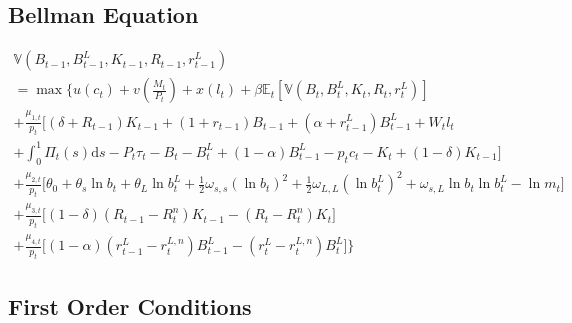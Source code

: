 \documentclass[11pt,a4paper,margin=1.5in]{article}
\begin{document}
\subsection{Bellman Equation}

\begin{multline}
	\mathbb{V}\!\left(B_{t-1}, B^L_{t-1}, K_{t-1}, R_{t-1}, r^L_{t-1}\right) \\= \max \Bigg\{u(c_t) + v\left(\frac{M_t}{P_t}\right) + x(l_t)  + \beta\mathbb{E}_t\!\left[\mathbb{V}\!\left(B_{t}, B^L_{t}, K_{t}, R_{t}, r^L_{t}\right)\right] \\
	+ \frac{\mu_{1,t}}{p_t} \Big[(\delta + R_{t-1})K_{t-1} + (1+r_{t-1})B_{t-1} + (\alpha + r^L_{t-1})B^L_{t-1} + W_tl_t \\+ \int^1_0\Pi_t(s)\text{d}s -P_t\tau_t -B_t - B^{L}_t + (1-\alpha)B^L_{t-1} - p_tc_t - K_t + (1-\delta)K_{t-1}\Big] \\
	+ \frac{\mu_{2,t}}{p_t}\Bigg[\theta_0 + \theta_s \ln b_t + \theta_L \ln b^L_t + \frac{1}{2}\omega_{s,s} \left(\ln b_t\right)^2 + \frac{1}{2}\omega_{L,L} \left(\ln b^L_t\right)^2 + \omega_{s,L}\ln b_t \ln b^L_t-\ln m_t\Bigg] \\
	+ \frac{\mu_{3,t}}{p_t}\Big[(1-\delta)\left(R_{t-1}-R^{n}_t\right)K_{t-1} - \left(R_t-R^{n}_t\right)K_t \Big] \\
	+ \frac{\mu_{4,t}}{p_t} \Big[(1-\alpha)\left(r^L_{t-1}-r^{L,n}_t\right)B^L_{t-1} - \left(r^L_t-r^{L,n}_t\right)B^L_t\Big]\Bigg\}
	\label{eq:Bellman}
\end{multline}

\subsection{First Order Conditions}
\end{document}
